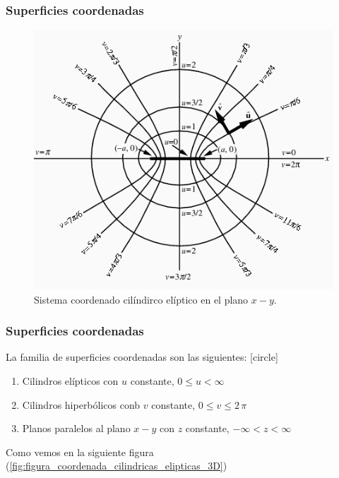 \begin{frame}
\frametitle{Superficies coordenadas}
\begin{figure}[H]
    \centering
    \includegraphics[scale=0.4]{Imagenes/EllipticCylindricalCoord_1000.png}
    \caption{Sistema coordenado cilíndirco elíptico en el plano $x-y$.}
    \label{fig:figura_coordenada_cilindricas_elipticas}
\end{figure}
\end{frame}
\begin{frame}
\frametitle{Superficies coordenadas}
La familia de superficies coordenadas son las siguientes:
[circle]
\begin{enumerate}
\item Cilindros elípticos con $u$ constante, $0 \leq u < \infty$
\item Cilindros hiperbólicos conb $v$ constante, $0 \leq v \leq 2 \, \pi$
\item Planos paralelos al plano $x-y$ con $z$ constante, $-\infty < z < \infty$
\end{enumerate}
Como vemos en la siguiente figura (\ref{fig:figura_coordenada_cilindricas_elipticas_3D})
\end{frame}
